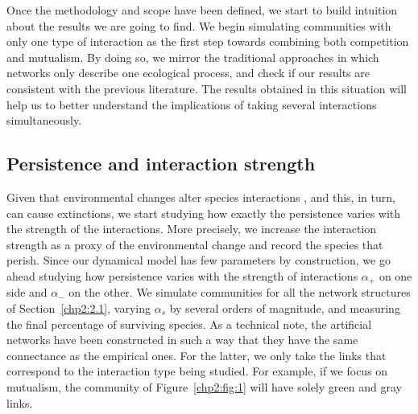 Once the methodology and scope have been defined, we start to build intuition about the results we are going to find. We begin simulating communities with only one type of interaction as the first step towards combining both competition and mutualism. By doing so, we mirror the traditional approaches in which networks only describe one ecological process, and check if our results are consistent with the previous literature. The results obtained in this situation will help us to better understand the implications of taking several interactions simultaneously. 

\subsection{Persistence and interaction strength}
Given that environmental changes alter species interactions \cite{Sun2022ExperimentalWetland,tabi2020species}, and this, in turn, can cause extinctions, we start studying  how exactly the persistence varies with the strength of the interactions. More precisely, we increase the interaction strength as a proxy of the environmental change and record the species that perish. Since our dynamical model has few parameters by construction, we go ahead studying how persistence varies with the strength of interactions $\alpha_+$ on one side and  $\alpha_-$ on the other. We simulate communities for all the network structures of Section~\ref{chp2:2.1}, varying $\alpha_s$ by several orders of magnitude, and measuring the final percentage of surviving species. 
As a technical note, the artificial networks have been constructed in such a way that they have the same connectance as the empirical ones.  For the latter, we only take the links that correspond to the interaction type being studied. For example, if we focus on mutualism, the community of Figure~\ref{chp2:fig:1} will have solely green and gray links.\\

